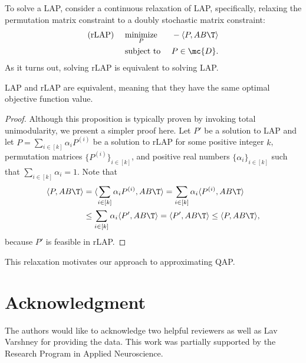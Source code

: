 \documentclass[11pt]{article}
\begin{document}
To solve a LAP, consider a continuous relaxation of LAP, specifically, relaxing the permutation matrix constraint to a doubly stochastic matrix constraint:
\begin{subequations} \label{eq:rLAP}
\begin{align}
		\text{(rLAP) } \quad &\underset{P}{\text{minimize}}  &&-\langle P, AB\T \rangle \\
		&\text{subject to } && P \in \mc{D}.
\end{align}
\end{subequations}
As it turns out, solving rLAP is equivalent to solving LAP.
\begin{prop}
	LAP and rLAP are equivalent, meaning that they have the same optimal objective function value.
\end{prop}
\begin{proof}
	Although this proposition is typically proven by invoking total unimodularity, we present a simpler proof here.	Let $P'$ be a solution to LAP and let $P = \sum_{i\in[k]} \alpha_i P^{(i)}$ be a solution to rLAP for some positive integer $k$, permutation matrices $\{P^{(i)}\}_{i \in [k]}$, and positive real numbers $\{\alpha_i\}_{i \in[k]}$ such that $\sum_{i \in [k]} \alpha_i=1$.  Note that 
	\begin{align*}
	\langle P,AB\T \rangle &= \langle  \sum_{i\in[k]} \alpha_i P^{(i)}, AB\T \rangle=  \sum_{i\in[k]} \alpha_i \langle  P^{(i)}, AB\T \rangle	 \\
	&\leq \sum_{i\in[k]} \alpha_i \langle P', AB\T  \rangle = \langle P', AB\T \rangle \leq \langle P, AB\T \rangle,
	\end{align*}
	because $P'$ is feasible in rLAP.
	\end{proof}
This relaxation motivates our approach to approximating QAP.

	



\section*{Acknowledgment}

The authors would like to acknowledge two helpful reviewers as well as Lav Varshney for providing the data. This work was partially supported by the Research Program in Applied Neuroscience. 




\end{document}
